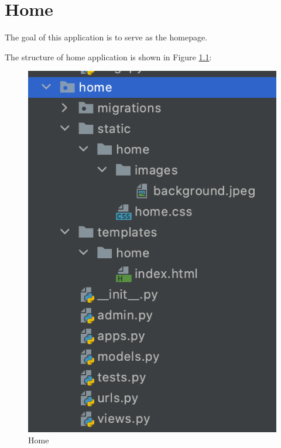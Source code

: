 
\chapter{Home}
The goal of this application is to serve as the homepage.


The structure of home application is shown in Figure \ref{fig:home}:
\begin{figure}[!hb]
  \centering
  \includegraphics[width=0.3\textheight]{home.png}
  \caption{Home}
  \label{fig:home}
\end{figure}


